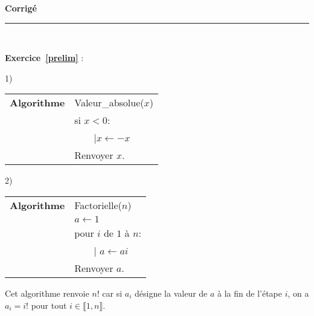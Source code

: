 \documentclass[11pt,a4paper]{article}
\title{}
\date{}
\newcommand{\HRule}{\rule{\linewidth}{0.5mm}}
\begin{document}
\pagestyle{fancy}

\fancyhead{}
 \fancyfoot{}


\newcommand{\lb}{\llbracket}
\newcommand{\rb}{\rrbracket}
\newcommand{\N}{\mathbb{N}}
\newcommand{\R}{\mathbb{R}}
\newcommand{\Z}{\mathbb{Z}}




\newcommand{\md}[3]{#1\ \equiv \ #2 \! \! \! \! \! \pmod {#3} }
\newcommand{\nmd}[3]{#1 \not \equiv #2 \! \! \! \! \!  \pmod {#3} }
\newcommand{\mda}[3]{#1 \equiv #2 \! \!  \pmod {#3} }
\newcommand{\nmda}[3]{#1 \not \equiv #2 \! \! \pmod {#3} }
\newcommand{\mo}[2]{#1 \! \! \! \! \! \pmod #2 }
\newcommand{\moa}[2]{#1 \! \!  \pmod {#2} }

\thispagestyle{fancy}

\begin{center}
    { \huge \bfseries
Corrigé
     \\ [0cm] }
    \HRule \\[0.5cm]
\end{center}

\textbf{Exercice~\ref{prelim}} :

  1)

\begin{tabular}{ll}
\textbf{Algorithme} &Valeur\_absolue($x$) \\
& si $x<0$:\\
&\ \ \ {\ \rm |}$x\leftarrow -x$\\
& Renvoyer $x$.
\end{tabular}

2)

\begin{tabular}{ll}
\textbf{Algorithme} &Factorielle($n$) \\
&$a\leftarrow 1$\\
&  pour $i$ de $1$ à $n$:\\
&\ \ \ {\ \rm |} $a\leftarrow ai$\\
& Renvoyer $a$.
\end{tabular}

Cet algorithme renvoie $n!$ car si $a_i$ désigne la valeur de $a$ à la fin de l'étape $i$, on a $a_i=i!$ pour tout $i\in \llbracket 1,n\rrbracket$. 
\end{document}
